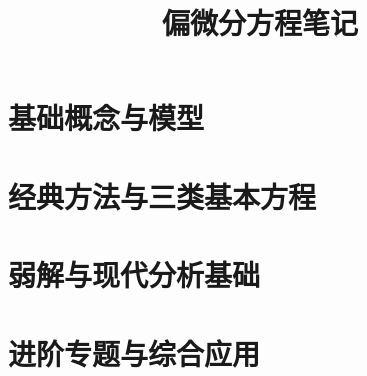 \documentclass[UTF8,12pt,a4paper,fontset=fandol]{ctexbook}
\title{偏微分方程笔记}
\author{}
\date{}
\begin{document}
\frontmatter %


\maketitle
\tableofcontents


\mainmatter

\part{基础概念与模型}





\part{经典方法与三类基本方程}









\part{弱解与现代分析基础}




\part{进阶专题与综合应用}




\appendix





\backmatter
\end{document}
